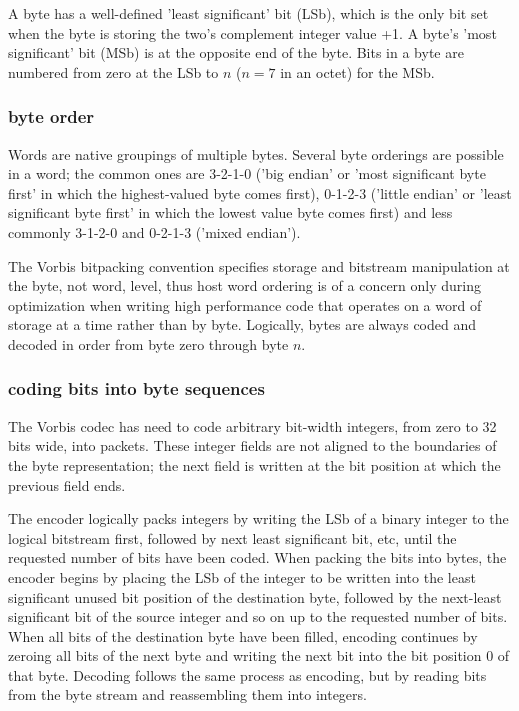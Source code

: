A byte has a well-defined 'least significant' bit (LSb), which is the
only bit set when the byte is storing the two's complement integer
value +1.  A byte's 'most significant' bit (MSb) is at the opposite
end of the byte. Bits in a byte are numbered from zero at the LSb to
$n$ ($n=7$ in an octet) for the
MSb.



\subsubsection{byte order}

Words are native groupings of multiple bytes.  Several byte orderings
are possible in a word; the common ones are 3-2-1-0 ('big endian' or
'most significant byte first' in which the highest-valued byte comes
first), 0-1-2-3 ('little endian' or 'least significant byte first' in
which the lowest value byte comes first) and less commonly 3-1-2-0 and
0-2-1-3 ('mixed endian').

The Vorbis bitpacking convention specifies storage and bitstream
manipulation at the byte, not word, level, thus host word ordering is
of a concern only during optimization when writing high performance
code that operates on a word of storage at a time rather than by byte.
Logically, bytes are always coded and decoded in order from byte zero
through byte $n$.



\subsubsection{coding bits into byte sequences}

The Vorbis codec has need to code arbitrary bit-width integers, from
zero to 32 bits wide, into packets.  These integer fields are not
aligned to the boundaries of the byte representation; the next field
is written at the bit position at which the previous field ends.

The encoder logically packs integers by writing the LSb of a binary
integer to the logical bitstream first, followed by next least
significant bit, etc, until the requested number of bits have been
coded.  When packing the bits into bytes, the encoder begins by
placing the LSb of the integer to be written into the least
significant unused bit position of the destination byte, followed by
the next-least significant bit of the source integer and so on up to
the requested number of bits.  When all bits of the destination byte
have been filled, encoding continues by zeroing all bits of the next
byte and writing the next bit into the bit position 0 of that byte.
Decoding follows the same process as encoding, but by reading bits
from the byte stream and reassembling them into integers.



